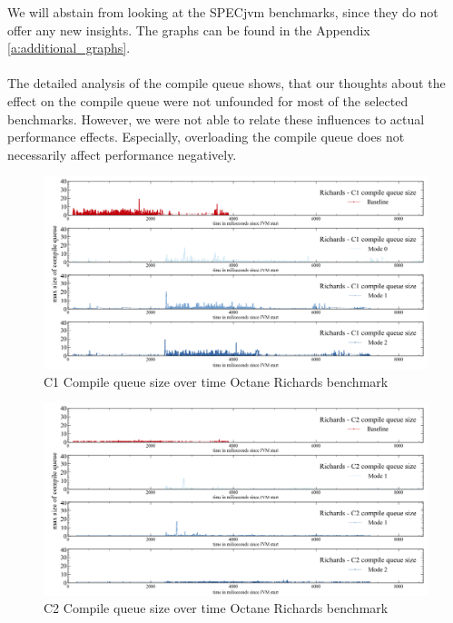We will abstain from looking at the SPECjvm benchmarks, since they do not offer any new insights. The graphs can be found in the Appendix \ref{a:additional_graphs}.
\\\\
The detailed analysis of the compile queue shows, that our thoughts about the effect on the compile queue were not unfounded for most of the selected benchmarks. However, we were not able to relate these influences to actual performance effects. Especially, overloading the compile queue does not necessarily affect performance negatively.
\begin{figure}[ht]
  \begin{center}
    \centering
    \includegraphics[width=1.0\textwidth]{figures/octane_queue_richards_separate_c1.png}
    \caption{C1 Compile queue size over time Octane Richards benchmark}
    \label{f:octane_queue_richards_separate_c1}
  \end{center}
\end{figure}
\begin{figure}[ht]
  \begin{center}
    \centering
    \includegraphics[width=1.0\textwidth]{figures/octane_queue_richards_separate_c2.png}
    \caption{C2 Compile queue size over time Octane Richards benchmark}
    \label{f:octane_queue_richards_separate_c2}
  \end{center}
\end{figure}
